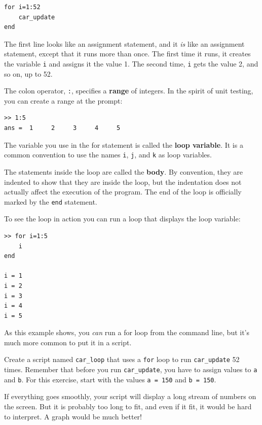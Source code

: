 \documentclass[
]{book}
\begin{document}
\begin{verbatim}
for i=1:52
    car_update
end
\end{verbatim}

The first line looks like an assignment statement, and it {\em is}
like an assignment statement, except that it runs more than once.  The
first time it runs, it creates the variable {\tt i} and assigns it the
value 1.  The second time, {\tt i} gets the value 2, and so on, up to
52.

The colon operator, {\tt :}, specifies a {\bf range} of integers.  In
the spirit of unit testing, you can create a range at the prompt:

\begin{verbatim}
>> 1:5
ans =  1     2     3     4     5
\end{verbatim}

The variable you use in the for statement is called the {\bf loop
variable}.  It is a common convention to use the names {\tt i},
{\tt j}, and {\tt k} as loop variables.

The statements inside the loop are called the {\bf body}.  By convention,
they are indented to show that they are inside the loop, but the
indentation does not actually affect the execution of the program.
The end of the loop is officially marked by the {\tt end} statement.

To see the loop in action you can run a loop that displays the
loop variable:

\begin{verbatim}
>> for i=1:5
    i
end

i = 1
i = 2
i = 3
i = 4
i = 5
\end{verbatim}

As this example shows, you {\em can} run a for loop from the
command line, but it's much more common to put it in a script.

\begin{ex}
Create a script named {\tt car\_loop} that uses a {\tt for}
loop to run {\tt car\_update} 52 times.  Remember that before you run
{\tt car\_update}, you have to assign values to {\tt a} and {\tt b}.
For this exercise, start with the values {\tt a = 150} and {\tt b =
150}.

If everything goes smoothly, your script will display a long stream
of numbers on the screen.  But it is probably too long
to fit, and even if it fit, it would be hard to interpret.
A graph would be much better!
\end{ex}
\end{document}
